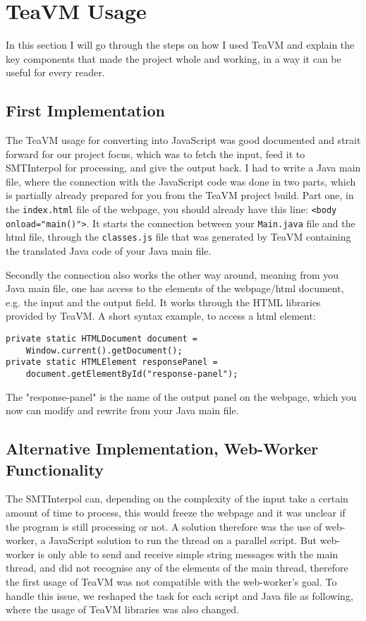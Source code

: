 \documentclass[12pt]{article}
\begin{document}
\section{TeaVM Usage}
In this section I will go through the steps on how I used TeaVM and explain the key components that made the project whole and working, in a way it can be useful for every reader. 

\subsection{First Implementation}

The TeaVM usage for converting into JavaScript was good documented and strait forward for our project focus, which was to fetch the input, feed it to SMTInterpol for processing, and give the output back. I had to write a Java main file, where the connection with the JavaScript code was done in two parts, which is partially already prepared for you from the TeaVM project build\cite{2}.
Part one, in the \verb|index.html| file of the webpage, you should already have this line: \verb|<body onload="main()">|. It starts the connection between your \verb|Main.java| file and the html file, through the \verb|classes.js| file that was generated by TeaVM containing the translated Java code of your Java main file.

Secondly the connection also works the other way around, meaning from you Java main file, one has access to the elements of the webpage/html document, e.g. the input and the output field. It works through the HTML libraries provided by TeaVM. A short syntax example, to access a html element:
\begin{verbatim}
private static HTMLDocument document = 
    Window.current().getDocument();
private static HTMLElement responsePanel =
    document.getElementById("response-panel");
\end{verbatim}
The "response-panel" is the name of the output panel on the webpage, which you now can modify and rewrite from your Java main file. 

\subsection{Alternative Implementation, Web-Worker Functionality}

The SMTInterpol can, depending on the complexity of the input take a certain amount of time to process, this would freeze the webpage and it was unclear if the program is still processing or not. A solution therefore was the use of web-worker, a JavaScript solution to run the thread on a parallel script.
But web-worker is only able to send and receive simple string messages with the main thread, and did not recognise any of the elements of the main thread, therefore the first usage of TeaVM was not compatible with the web-worker's goal. To handle this issue, we reshaped the task for each script and Java file as following, where the usage of TeaVM libraries was also changed.
\end{document}
